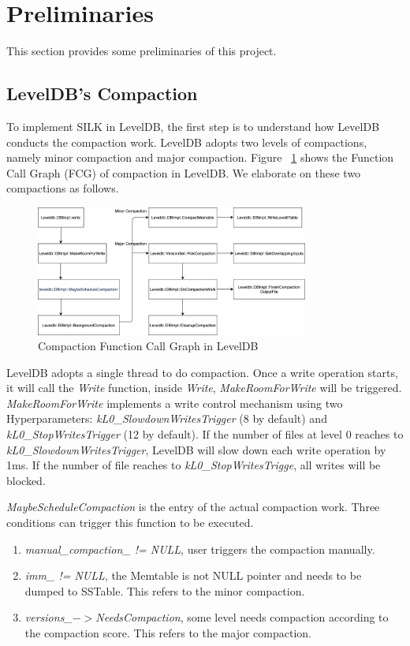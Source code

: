 \documentclass[letter,twocolumn,10pt]{article}
\begin{document}
\section{Preliminaries}
\label{sec:preliminary}
This section provides some preliminaries of this project.

\subsection {LevelDB's Compaction}
\label{sec:leveldbcom}
To implement SILK in LevelDB, the first step is to understand how LevelDB conducts the compaction work. LevelDB adopts two levels of compactions, namely minor compaction and major compaction. Figure ~\ref{leveldb_comaction} shows the Function Call Graph (FCG) of compaction in LevelDB. We elaborate on these two compactions as follows.

\begin{figure}[!htbp]
\centering
\includegraphics[width=0.8\textwidth]{./leveldb_comaction.png}
\caption{Compaction Function Call Graph in LevelDB}
\label{leveldb_comaction}
\end{figure}

LevelDB adopts a single thread to do compaction. Once a write operation starts, it will call the \textit{Write} function, inside \textit{Write}, \textit{MakeRoomForWrite} will be triggered. \textit{MakeRoomForWrite} implements a write control mechanism using two Hyperparameters: \textit{kL0\_SlowdownWritesTrigger} (8 by default) and \textit{kL0\_StopWritesTrigger} (12 by default). If the number of files at level 0 reaches to \textit{kL0\_SlowdownWritesTrigger}, LevelDB will slow down each write operation by 1ms. If the number of file reaches to \textit{kL0\_StopWritesTrigge}, all writes will be blocked. 

\textit{MaybeScheduleCompaction} is the entry of the actual compaction work. Three conditions can trigger this function to be executed.
\begin{enumerate}
\item \textit{manual\_compaction\_ != NULL}, user triggers the compaction manually.
\item \textit{imm\_ != NULL}, the Memtable is not NULL pointer and needs to be dumped to SSTable. This refers to the minor compaction.
\item \textit{versions\_$-$$>$NeedsCompaction}, some level needs compaction according to the compaction score. This refers to the major compaction.
\end{enumerate}
\end{document}
